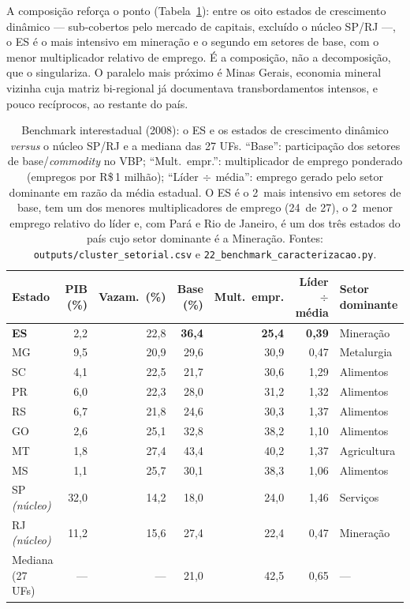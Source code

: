 \documentclass[11pt,a4paper]{article}
\begin{document}
A composição reforça o ponto (Tabela~\ref{tab:cluster}): entre os oito estados de crescimento
dinâmico --- sub-cobertos pelo mercado de capitais, excluído o núcleo SP/RJ ---, o ES é o mais
intensivo em mineração e o segundo em setores de base, com o menor multiplicador relativo de
emprego. É a composição, não a decomposição, que o singulariza. O paralelo mais próximo é
Minas Gerais, economia mineral vizinha cuja matriz bi-regional \citep{domingues2002matriz}
já documentava transbordamentos intensos, e pouco recíprocos, ao restante do país.

\begin{table}[tbp]
\centering\small
\setlength{\tabcolsep}{4.5pt}
\begin{tabular}{lrrrrrl}
\toprule
Estado & PIB (\%) & Vazam.\ (\%) & Base (\%) & Mult.\ empr. & Líder$\div$média & Setor dominante\\
\midrule
\textbf{ES} & 2,2 & 22,8 & \textbf{36,4} & \textbf{25,4} & \textbf{0,39} & Mineração\\
MG & 9,5 & 20,9 & 29,6 & 30,9 & 0,47 & Metalurgia\\
SC & 4,1 & 22,5 & 21,7 & 30,6 & 1,29 & Alimentos\\
PR & 6,0 & 22,3 & 28,0 & 31,2 & 1,32 & Alimentos\\
RS & 6,7 & 21,8 & 24,6 & 30,3 & 1,37 & Alimentos\\
GO & 2,6 & 25,1 & 32,8 & 38,2 & 1,10 & Alimentos\\
MT & 1,8 & 27,4 & 43,4 & 40,2 & 1,37 & Agricultura\\
MS & 1,1 & 25,7 & 30,1 & 38,3 & 1,06 & Alimentos\\
\midrule
SP \emph{(núcleo)} & 32,0 & 14,2 & 18,0 & 24,0 & 1,46 & Serviços\\
RJ \emph{(núcleo)} & 11,2 & 15,6 & 27,4 & 22,4 & 0,47 & Mineração\\
\midrule
Mediana (27 UFs) & --- & --- & 21,0 & 42,5 & 0,65 & ---\\
\bottomrule
\end{tabular}
\caption{Benchmark interestadual (2008): o ES e os estados de crescimento dinâmico
\emph{versus} o núcleo SP/RJ e a mediana das 27 UFs. ``Base'': participação dos setores de
base/\emph{commodity} no VBP; ``Mult.\ empr.'': multiplicador de emprego ponderado
(empregos por R\$\,1 milhão); ``Líder$\,\div\,$média'': emprego gerado pelo setor dominante
em razão da média estadual. O ES é o 2\textordmasculine\ mais intensivo em setores de base,
tem um dos menores multiplicadores de emprego (24\textordmasculine\ de 27), o
2\textordmasculine\ menor emprego relativo do líder e, com Pará e Rio de Janeiro, é um dos
três estados do país cujo setor dominante é a Mineração. Fontes:
\texttt{outputs/cluster\_setorial.csv} e \texttt{22\_benchmark\_caracterizacao.py}.}
\label{tab:cluster}
\end{table}
\end{document}
